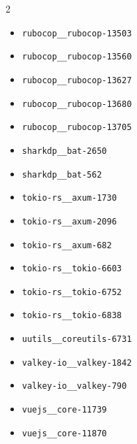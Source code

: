 \begin{multicols}{2}
\begin{itemize}
\item \texttt{rubocop\_\_rubocop-13503}
\item \texttt{rubocop\_\_rubocop-13560}
\item \texttt{rubocop\_\_rubocop-13627}
\item \texttt{rubocop\_\_rubocop-13680}
\item \texttt{rubocop\_\_rubocop-13705}
\item \texttt{sharkdp\_\_bat-2650}
\item \texttt{sharkdp\_\_bat-562}
\item \texttt{tokio-rs\_\_axum-1730}
\item \texttt{tokio-rs\_\_axum-2096}
\item \texttt{tokio-rs\_\_axum-682}
\item \texttt{tokio-rs\_\_tokio-6603}
\item \texttt{tokio-rs\_\_tokio-6752}
\item \texttt{tokio-rs\_\_tokio-6838}
\item \texttt{uutils\_\_coreutils-6731}
\item \texttt{valkey-io\_\_valkey-1842}
\item \texttt{valkey-io\_\_valkey-790}
\item \texttt{vuejs\_\_core-11739}
\item \texttt{vuejs\_\_core-11870}
\end{itemize}
\end{multicols}

